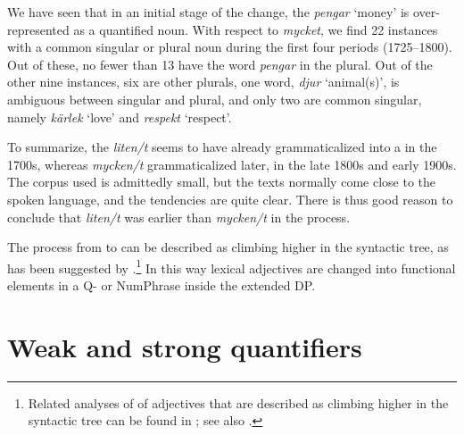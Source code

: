 \documentclass[output=paper]{langscibook}
\begin{document}
We have seen that in an initial stage of the change, the  \textit{pengar} ‘money’ is over-represented as a quantified noun. With respect to \textit{mycket}, we find 22 instances with a common  singular or plural noun during the first four periods (1725–1800). Out of these, no fewer than 13 have the word \textit{pengar} in the plural. Out of the other nine instances, six are other plurals, one word, \textit{djur} ‘animal(s)’, is ambiguous between singular and plural, and only two are common  singular, namely \textit{kärlek} ‘love’ and \textit{respekt} ‘respect’. 



To summarize, the  \textit{liten/t} seems to have already grammaticalized into a  in the 1700s, whereas \textit{mycken/t} grammaticalized later, in the late 1800s and early 1900s. The corpus used is admittedly small, but the texts normally come close to the spoken language, and the tendencies are quite clear. There is thus good reason to conclude that \textit{liten/t} was earlier than \textit{mycken/t} in the  process. 



The  process from  to  can be described as climbing higher in the syntactic tree, as has been suggested by \textcite{RobertsRoussou1999, RobertsRoussou2003}.\footnote{Related analyses of  of adjectives that are described as climbing higher in the syntactic tree can be found in \citet{Oxford2017}; see also .} In this way lexical adjectives are changed into functional elements in a Q- or NumPhrase inside the extended DP.


\section{Weak and strong quantifiers}\label{sec:delsing:5}
\end{document}
